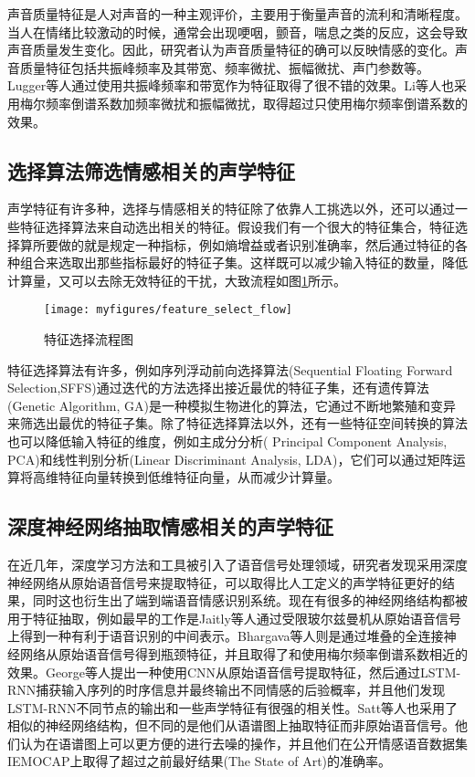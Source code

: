 声音质量特征是人对声音的一种主观评价，主要用于衡量声音的流利和清晰程度。当人在情绪比较激动的时候，通常会出现哽咽，颤音，喘息之类的反应，这会导致声音质量发生变化。因此，研究者认为声音质量特征的确可以反映情感的变化。声音质量特征包括共振峰频率及其带宽、频率微扰、振幅微扰、声门参数等。Lugger等人通过使用共振峰频率和带宽作为特征取得了很不错的效果。Li等人也采用梅尔频率倒谱系数加频率微扰和振幅微扰，取得超过只使用梅尔频率倒谱系数的效果。


\subsection{选择算法筛选情感相关的声学特征}
\label{ssec:algorithm_select}
声学特征有许多种，选择与情感相关的特征除了依靠人工挑选以外，还可以通过一些特征选择算法来自动选出相关的特征。假设我们有一个很大的特征集合，特征选择算所要做的就是规定一种指标，例如熵增益或者识别准确率，然后通过特征的各种组合来选取出那些指标最好的特征子集。这样既可以减少输入特征的数量，降低计算量，又可以去除无效特征的干扰，大致流程如图\ref{fig:feature_select_flow}所示。

\begin{figure}[htb] %
    \centering
    \texttt{[image: myfigures/feature\_select\_flow]}
    \caption{特征选择流程图}
    \label{fig:feature_select_flow}
\end{figure}

特征选择算法有许多，例如序列浮动前向选择算法(Sequential Floating Forward Selection,SFFS)通过迭代的方法选择出接近最优的特征子集，还有遗传算法(Genetic Algorithm, GA)是一种模拟生物进化的算法，它通过不断地繁殖和变异来筛选出最优的特征子集。除了特征选择算法以外，还有一些特征空间转换的算法也可以降低输入特征的维度，例如主成分分析( Principal Component Analysis, PCA)和线性判别分析(Linear Discriminant Analysis, LDA)，它们可以通过矩阵运算将高维特征向量转换到低维特征向量，从而减少计算量。


\subsection{深度神经网络抽取情感相关的声学特征}
\label{ssec:dnn_extract}
在近几年，深度学习方法和工具被引入了语音信号处理领域，研究者发现采用深度神经网络从原始语音信号来提取特征，可以取得比人工定义的声学特征更好的结果，同时这也衍生出了端到端语音情感识别系统。现在有很多的神经网络结构都被用于特征抽取，例如最早的工作是Jaitly等人通过受限玻尔兹曼机从原始语音信号上得到一种有利于语音识别的中间表示。Bhargava等人则是通过堆叠的全连接神经网络从原始语音信号得到瓶颈特征，并且取得了和使用梅尔频率倒谱系数相近的效果。George等人提出一种使用CNN从原始语音信号提取特征，然后通过LSTM-RNN捕获输入序列的时序信息并最终输出不同情感的后验概率，并且他们发现LSTM-RNN不同节点的输出和一些声学特征有很强的相关性。Satt等人也采用了相似的神经网络结构，但不同的是他们从语谱图上抽取特征而非原始语音信号。他们认为在语谱图上可以更方便的进行去噪的操作，并且他们在公开情感语音数据集IEMOCAP上取得了超过之前最好结果(The State of Art)的准确率。

